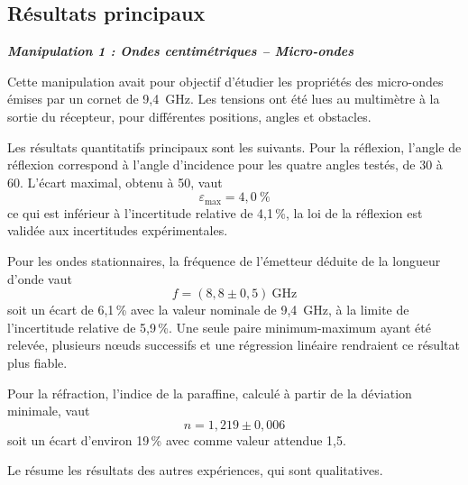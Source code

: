 \newpage
\subsection{Résultats principaux}

\textbf{\textit{Manipulation 1 : Ondes centimétriques -- Micro-ondes}}

Cette manipulation avait pour objectif d'étudier les propriétés des micro-ondes émises par un cornet de 9,4~GHz. Les tensions ont été lues au multimètre à la sortie du récepteur, pour différentes positions, angles et obstacles.

Les résultats quantitatifs principaux sont les suivants. Pour la réflexion, l'angle de réflexion correspond à l'angle d'incidence pour les quatre angles testés, de 30\textdegree{} à 60\textdegree. L'écart maximal, obtenu à 50\textdegree, vaut
\[ \varepsilon_{\max} = 4{,}0~\% \]
ce qui est inférieur à l'incertitude relative de 4,1\,\%, la loi de la réflexion est validée aux incertitudes expérimentales.

Pour les ondes stationnaires, la fréquence de l'émetteur déduite de la longueur d'onde vaut
\[ f = (8{,}8 \pm 0{,}5)~\text{GHz} \]
soit un écart de 6,1\,\% avec la valeur nominale de 9,4~GHz, à la limite de l'incertitude relative de 5,9\,\%. Une seule paire minimum-maximum ayant été relevée, plusieurs nœuds successifs et une régression linéaire rendraient ce résultat plus fiable.

Pour la réfraction, l'indice de la paraffine, calculé à partir de la déviation minimale, vaut
\[ n = 1{,}219 \pm 0{,}006 \]
soit un écart d'environ 19\,\% avec comme valeur attendue 1,5.

Le  résume les résultats des autres expériences, qui sont qualitatives.

